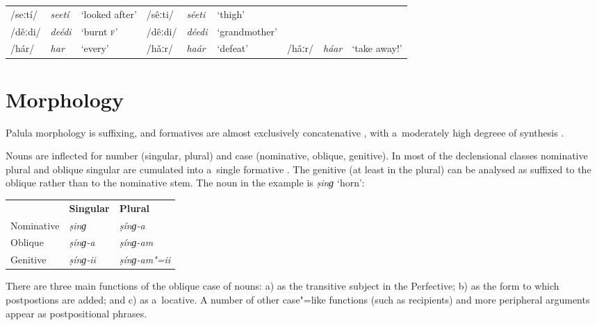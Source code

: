 \begin{table}[H]
\begin{tabularx}{\textwidth}{ l l Q l l Q l l Q }
/seːtí/ &
\textit{seetí} &
`looked after' &
/sêːti/ &
\textit{séeti} &
`thigh' &
&
&
\\
/děːdi/ &
\textit{deédi} &
`burnt \textsc{f}' &
/dêːdi/ &
\textit{déedi} &
`grand\-mother' & & &
\\
/hár/ &
\textit{har} &
`every' &
/hǎːr/ &
\textit{haár} &
`defeat' &
/hâːr/ &
\textit{háar} &
`take away!' \\
\end{tabularx}
\end{table}


\section{Morphology}
\label{sec:2-2}

Palula morphology is suffixing, and formatives are almost exclusively concatenative \citep[86--9]{bickelnichols2005a}, with a~moderately high degreee of synthesis \citep[94--97]{bickelnichols2005c}. 


Nouns are inflected for number (singular, plural) and case (nominative, oblique, genitive). In most of the declensional classes nominative plural and oblique singular are cumulated into a~single formative \citep[90--93]{bickelnichols2005b}. The genitive (at least in the plural) can be analysed as suffixed to the oblique rather than to the nominative stem. The noun in the example is \textit{ṣinɡ} `horn':


\begin{table}[H]
\begin{tabular}{ l l l }
&
\textbf{Singular} &
\textbf{Plural} \\
Nominative &
\textit{ṣinɡ} &
\textit{ṣínɡ-a} \\
Oblique &
\textit{ṣínɡ-a} &
\textit{ṣínɡ-am} \\
Genitive &
\textit{ṣínɡ-ii} &
\textit{ṣínɡ-am"=ii} \\
\end{tabular}
\end{table}



There are three main functions of the oblique case of nouns: a) as the transitive subject in the Perfective; b) as the form to which postpostions are added; and c) as a~locative. A number of other case"=like functions (such as recipients) and more peripheral arguments appear as postpositional phrases.


